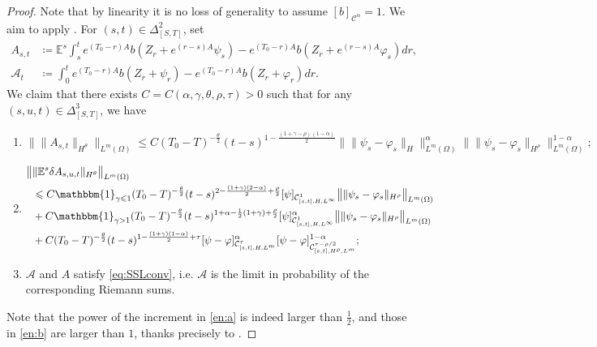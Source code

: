 \documentclass[11pt,a4paper]{article}
\newcommand{\cC}{\mathcal{C}}
\newcommand{\Op}{A}
\newcommand{\EE}{\mathbb{E}}
\renewcommand{\phi}{\varphi}
\renewcommand{\le}{\leqslant}
\numberwithin{equation}{section}
\let\cref\crtcref
\theoremstyle{definition}
\theoremstyle{remark}
\theoremstyle{plain}
\begin{document}
\begin{proof}
Note that by linearity it is no loss of generality to assume $[b]_{\cC^\alpha}=1$. %
%
%
%
We aim to apply \cref{lem:SSL}. For $(s,t) \in \Delta^2_{[S,T]}$, set 
\begin{align*}
    A_{s,t}&\coloneqq \EE^s \int_s^t e^{(T_0-r)\Op} b(Z_r+e^{(r-s)\Op}\psi_{s}) - e^{(T_0-r)\Op} b(Z_r+e^{(r-s)\Op}\phi_{s})dr,\\
    \mathcal{A}_{t}&\coloneqq\int_0^t e^{(T_0-r)\Op} b(Z_r+\psi_r)-e^{(T_0-r)\Op}b(Z_r+\phi_r) dr.
\end{align*}
We claim that there exists $C=C(\alpha,\gamma,\theta,\rho,\tau)>0$ such that for any $(s,u,t) \in \Delta^3_{[S,T]}$, we have
\begin{enumerate}[label=(\alph*)]
\item \label{en:a}$$\big\|\|A_{s,t}\|_{H^\theta}\big\|_{L^m(\Omega)}\le   C(T_0-T)^{-\frac\theta2}  (t-s)^{1-\frac{(1+\gamma-\rho)(1-\alpha)}{2}}\big\|\|\psi_s-\phi_s\|_{H}\big\|_{L^m(\Omega)}^\alpha\big\|\|\psi_s-\phi_s\|_{H^\rho}\big\|_{L^m(\Omega)}^{1-\alpha};$$
\item \label{en:b} 
\begin{align*}\big\|&\|\EE^s \delta A_{s,u,t}\|_{H^\theta}\big\|_{L^m(\Omega)}\\
&\le C\mathbbm{1}_{\gamma\le1}(T_0-T)^{-\frac\theta2}  (t-s)^{2-\frac{(1+\gamma)(2-\alpha)}{2}+\frac\rho2} [\psi]_{\mathcal{C}^{1}_{[s,t],H,L^\infty}}\big\|\|\psi_s-\phi_s\|_{H^\rho}\big\|_{L^m(\Omega)}\\
&+ C\mathbbm{1}_{\gamma>1}(T_0-T)^{-\frac\theta2}  (t-s)^{1+\alpha-\frac{1}{2}(1+\gamma)+\frac{\rho}{2}}[\psi]^\alpha_{\mathcal{C}^{1}_{[s,t],H,L^\infty}}\big\|\|\psi_s-\phi_s\|_{H^\rho}\big\|_{L^m(\Omega)}\\
&+ C  (T_0-T)^{-\frac{\theta}{2}}(t-s)^{1-\frac{(1+\gamma)(1-\alpha)}{2}+\tau}[\psi-\phi]^\alpha_{\mathcal{C}^{\tau}_{[s,t],H,L^m}}[\psi-\phi]^{1-\alpha}_{\mathcal{C}^{\tau-\rho/2}_{[s,t],H^\rho,L^m}};
\end{align*}
\item \label{en:c} $\mathcal{A}$ and $A$ satisfy \eqref{eq:SSLconv}, i.e. $\mathcal{A}$ is the limit in probability of the corresponding Riemann sums.
\end{enumerate}
Note that the power of the increment in \ref{en:a} is indeed larger than $\frac12$, and those in \ref{en:b} are larger than $1$, thanks precisely to \cref{a:manyineq}.

\end{proof}
\end{document}
